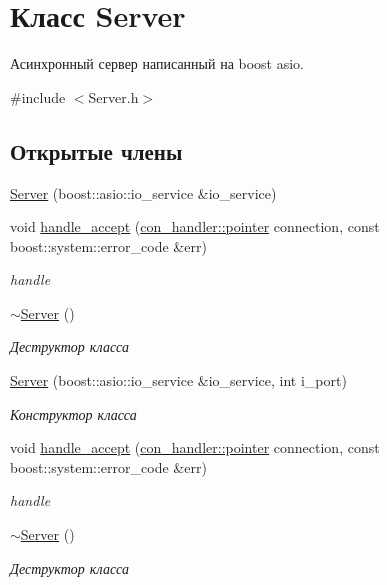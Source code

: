 \hypertarget{class_server}{}\section{Класс Server}
\label{class_server}


Асинхронный сервер написанный на boost asio.  




{\ttfamily \#include $<$Server.\+h$>$}

\subsection*{Открытые члены}
\begin{DoxyCompactItemize}
\item 
\mbox{\hyperlink{class_server_ac9ad7c8bb7fe2f5da5101da1297c9ae1}{Server}} (boost\+::asio\+::io\+\_\+service \&io\+\_\+service)
\item 
void \mbox{\hyperlink{group__servercpp_gadb53e5d1b7c0ad8a79ce236c8ca5d50c}{handle\+\_\+accept}} (\mbox{\hyperlink{classcon__handler_ada4a1b970f9fd8e55460a58cf7f7ce2c}{con\+\_\+handler\+::pointer}} connection, const boost\+::system\+::error\+\_\+code \&err)
\begin{DoxyCompactList}\small\item\em handle \end{DoxyCompactList}\item 
\mbox{\hyperlink{group__servercpp_ga4b3aa2579cb1c8cd1d069582c14d0fa6}{$\sim$\+Server}} ()
\begin{DoxyCompactList}\small\item\em Деструктор класса \end{DoxyCompactList}\item 
\mbox{\hyperlink{class_server_a64e726d6d9e85b00ba86488badb330d4}{Server}} (boost\+::asio\+::io\+\_\+service \&io\+\_\+service, int i\+\_\+port)
\begin{DoxyCompactList}\small\item\em Конструктор класса \end{DoxyCompactList}\item 
void \mbox{\hyperlink{class_server_adb53e5d1b7c0ad8a79ce236c8ca5d50c}{handle\+\_\+accept}} (\mbox{\hyperlink{classcon__handler_ada4a1b970f9fd8e55460a58cf7f7ce2c}{con\+\_\+handler\+::pointer}} connection, const boost\+::system\+::error\+\_\+code \&err)
\begin{DoxyCompactList}\small\item\em handle \end{DoxyCompactList}\item 
\mbox{\hyperlink{class_server_a4b3aa2579cb1c8cd1d069582c14d0fa6}{$\sim$\+Server}} ()
\begin{DoxyCompactList}\small\item\em Деструктор класса \end{DoxyCompactList}\end{DoxyCompactItemize}


